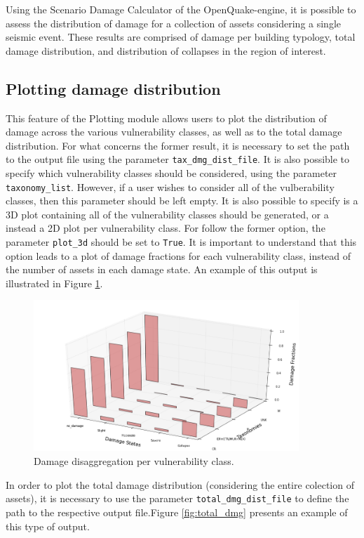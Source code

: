 Using the Scenario Damage Calculator \citep{SilvaEtAl2014a} of the OpenQuake-engine, it is possible to assess the distribution of damage for a collection of assets considering a single seismic event. These results are comprised of damage per building typology, total damage distribution, and distribution of collapses in the region of interest.

\subsection{Plotting damage distribution}
\label{subsec:plot-damage_disag}
This feature of the Plotting module allows users to plot the distribution of damage across the various vulnerability classes, as well as to the total damage distribution. For what concerns the former result, it is necessary to set the path to the output file using the parameter \verb=tax_dmg_dist_file=. It is also possible to specify which vulnerability classes should be considered, using the parameter \verb=taxonomy_list=. However, if a user wishes to consider all of the vulberability classes, then this parameter should be left empty. It is also possible to specify is a 3D plot containing all of the vulnerability classes should be generated, or a instead a 2D plot per vulnerability class. For follow the former option, the parameter \verb=plot_3d= should be set to \verb=True=. It is important to understand that this option leads to a plot of damage fractions for each vulnerability class, instead of the number of assets in each damage state. An example of this output is illustrated in Figure \ref{fig:damage_disag}.

\begin{figure}[htb]
  \centering
      \includegraphics[width=10cm]{figures/damage_distribution.png}
  \caption{Damage disaggregation per vulnerability class.}
  \label{fig:damage_disag}
\end{figure}

In order to plot the total damage distribution (considering the entire colection of assets), it is necessary to use the parameter \verb=total_dmg_dist_file= to define the path to the respective output file.Figure \ref{fig:total_dmg} presents an example of this type of output.

